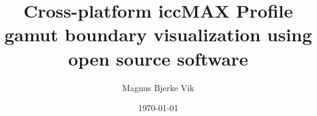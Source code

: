 \documentclass[notitlepage, 11pt]{article}
\title{Cross-platform iccMAX Profile gamut boundary visualization using open source software}
\author{Magnus Bjerke Vik}
\date{\today}
\begin{document}

\maketitle
\begin{abstract}
	
\end{abstract}
\clearpage

\tableofcontents
\clearpage

\listoffigures
\clearpage





\clearpage

\begin{appendices}
	
\end{appendices}
\end{document}
